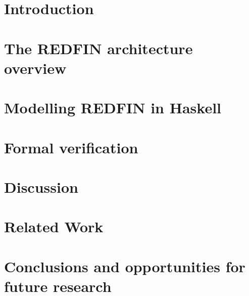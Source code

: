 \documentclass[sigplan,10pt,review,anonymous]{acmart}
\begin{document}
\section{Introduction}



\section{The REDFIN architecture overview\label{sec-redfin}}



\section{Modelling REDFIN in Haskell\label{sec-transformer}}



\section{Formal verification\label{sec-verification}}



\section{Discussion\label{sec-discussion}}


\section{Related Work\label{sec-related}}


\section{Conclusions and opportunities for future research\label{sec-future}}



\end{document}
